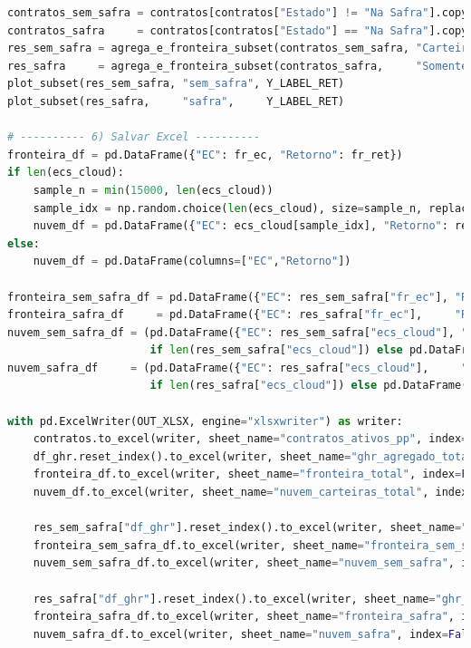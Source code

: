 \documentclass[11pt,a4paper]{article}
\newcommand{\1}{\mathbf{1}}
\begin{document}
\begin{lstlisting}[language=Python, caption={risk_frontier.py (versão completa com normalização por prazo e visões)}]
contratos_sem_safra = contratos[contratos["Estado"] != "Na Safra"].copy()
contratos_safra     = contratos[contratos["Estado"] == "Na Safra"].copy()
res_sem_safra = agrega_e_fronteira_subset(contratos_sem_safra, "Carteira (sem Safra)")
res_safra     = agrega_e_fronteira_subset(contratos_safra,     "Somente Safra")
plot_subset(res_sem_safra, "sem_safra", Y_LABEL_RET)
plot_subset(res_safra,     "safra",     Y_LABEL_RET)

# ---------- 6) Salvar Excel ----------
fronteira_df = pd.DataFrame({"EC": fr_ec, "Retorno": fr_ret})
if len(ecs_cloud):
    sample_n = min(15000, len(ecs_cloud))
    sample_idx = np.random.choice(len(ecs_cloud), size=sample_n, replace=False)
    nuvem_df = pd.DataFrame({"EC": ecs_cloud[sample_idx], "Retorno": rets_cloud[sample_idx]})
else:
    nuvem_df = pd.DataFrame(columns=["EC","Retorno"])

fronteira_sem_safra_df = pd.DataFrame({"EC": res_sem_safra["fr_ec"], "Retorno": res_sem_safra["fr_ret"]})
fronteira_safra_df     = pd.DataFrame({"EC": res_safra["fr_ec"],     "Retorno": res_safra["fr_ret"]})
nuvem_sem_safra_df = (pd.DataFrame({"EC": res_sem_safra["ecs_cloud"], "Retorno": res_sem_safra["rets_cloud"]})
                      if len(res_sem_safra["ecs_cloud"]) else pd.DataFrame(columns=["EC","Retorno"]))
nuvem_safra_df     = (pd.DataFrame({"EC": res_safra["ecs_cloud"],     "Retorno": res_safra["rets_cloud"]})
                      if len(res_safra["ecs_cloud"]) else pd.DataFrame(columns=["EC","Retorno"]))

with pd.ExcelWriter(OUT_XLSX, engine="xlsxwriter") as writer:
    contratos.to_excel(writer, sheet_name="contratos_ativos_pp", index=False)
    df_ghr.reset_index().to_excel(writer, sheet_name="ghr_agregado_total", index=False)
    fronteira_df.to_excel(writer, sheet_name="fronteira_total", index=False)
    nuvem_df.to_excel(writer, sheet_name="nuvem_carteiras_total", index=False)

    res_sem_safra["df_ghr"].reset_index().to_excel(writer, sheet_name="ghr_agregado_sem_safra", index=False)
    fronteira_sem_safra_df.to_excel(writer, sheet_name="fronteira_sem_safra", index=False)
    nuvem_sem_safra_df.to_excel(writer, sheet_name="nuvem_sem_safra", index=False)

    res_safra["df_ghr"].reset_index().to_excel(writer, sheet_name="ghr_agregado_safra", index=False)
    fronteira_safra_df.to_excel(writer, sheet_name="fronteira_safra", index=False)
    nuvem_safra_df.to_excel(writer, sheet_name="nuvem_safra", index=False)


\end{lstlisting}
\end{document}

